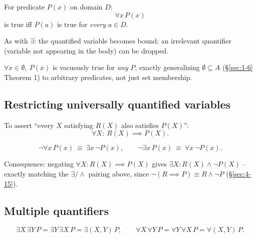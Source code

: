 \documentclass[11pt]{article}
\begin{document}
\begin{definition}
For predicate $P(x)$ on domain $D$:
\[
\forall x\, P(x)
\]
is true iff $P(a)$ is true for \emph{every} $a\in D$.
\end{definition}

\begin{note}
As with $\exists$: the quantified variable becomes bound; an irrelevant quantifier (variable not appearing in the body) can be dropped.
\end{note}

\bigskip
\begin{note}
$\forall x\in\emptyset,\ P(x)$ is vacuously true for \emph{any} $P$, exactly generalizing $\emptyset\subseteq A$ (\S\ref{sec:1-6} Theorem 1) to arbitrary predicates, not just set membership.
\end{note}

\subsection{Restricting universally quantified variables}
\label{sec:5-9}

\begin{note}
To assert ``every $X$ satisfying $R(X)$ also satisfies $P(X)$'':
\[
\forall X:\ R(X) \implies P(X).
\]
\end{note}

\bigskip
\begin{theorem}
\[
\neg\forall x\, P(x) \ \equiv\ \exists x\,\neg P(x), \qquad \neg\exists x\, P(x) \ \equiv\ \forall x\,\neg P(x).
\]
\end{theorem}
\begin{note}
Consequence: negating $\forall X: R(X)\implies P(X)$ gives $\exists X: R(X)\wedge\neg P(X)$ -- exactly matching the $\exists/\wedge$ pairing above, since $\neg(R\implies P) \equiv R\wedge\neg P$ (\S\ref{sec:4-15}).
\end{note}

\subsection{Multiple quantifiers}
\label{sec:5-10}

\begin{note}
\[
\exists X\,\exists Y\, P = \exists Y\,\exists X\, P = \exists(X,Y)\, P, \qquad
\forall X\,\forall Y\, P = \forall Y\,\forall X\, P = \forall(X,Y)\, P.
\]
\end{note}
\end{document}
